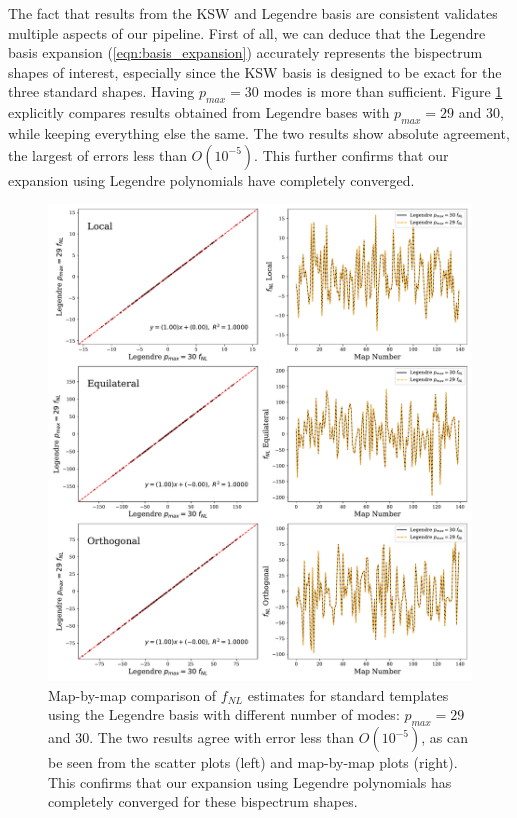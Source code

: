 The fact that results from the KSW and Legendre basis are consistent validates multiple aspects of our pipeline. First of all, we can deduce that the Legendre basis expansion (\ref{eqn:basis_expansion}) accurately represents the bispectrum shapes of interest, especially since the KSW basis is designed to be exact for the three standard shapes. Having $p_{max}=30$ modes is more than sufficient. Figure \ref{fig:map_by_map_Legendre_30_29} explicitly compares results obtained from Legendre bases with $p_{max}=29$ and $30$, while keeping everything else the same. The two results show absolute agreement, the largest of errors less than $O(10^{-5})$. This further confirms that our expansion using Legendre polynomials have completely converged.

\begin{figure}[htbp!] 
	\centering    
	\includegraphics[width=\textwidth]{map_by_map_Legendre_30_29.pdf}
	\caption{Map-by-map comparison of $f_{NL}$ estimates for standard templates using the Legendre basis with different number of modes: $p_{max}=29$ and $30$. The two results agree with error less than $O(10^{-5})$, as can be seen from the scatter plots (left) and map-by-map plots (right). This confirms that our expansion using Legendre polynomials has completely converged for these bispectrum shapes.}
	\label{fig:map_by_map_Legendre_30_29}
\end{figure}

